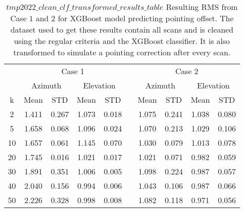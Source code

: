 \begin{table}[!htbp]
    \centering
    \caption{$tmp2022\_clean\_clf\_transformed\_results\_table$
    Resulting RMS from Case $1$ and $2$ for XGBoost model predicting pointing offset.
    The dataset used to get these results contain all scans and is cleaned using the regular criteria and the XGBoost classifier.
    It is also transformed to simulate a pointing correction after every scan.}
    \begin{tabular}{ccccc c cccc}
        \toprule
        \multicolumn{1}{c}{} & \multicolumn{4}{c}{Case 1} & & \multicolumn{4}{c}{Case 2} \\
        \cmidrule(lr){2-5} \cmidrule(lr){7-10}
        \multicolumn{1}{c}{} & \multicolumn{2}{c}{Azimuth} & \multicolumn{2}{c}{Elevation} & & \multicolumn{2}{c}{Azimuth} & \multicolumn{2}{c}{Elevation} \\ 
        \cmidrule(lr){2-5} \cmidrule(lr){7-10}
        k & Mean & STD & Mean & STD & & Mean & STD & Mean & STD \\ 
        \midrule
         2 &     1.411 &     0.267 &     1.073 &     0.018 &  &  1.075 &     0.241 &     1.038 &     0.080 \\
         5 &     1.658 &     0.068 &     1.096 &     0.024 &  &  1.070 &     0.213 &     1.029 &     0.106 \\
        10 &     1.657 &     0.061 &     1.145 &     0.070 &  &  1.030 &     0.079 &     1.013 &     0.078 \\
        20 &     1.745 &     0.016 &     1.021 &     0.017 &  &  1.021 &     0.071 &     0.982 &     0.059 \\
        30 &     1.891 &     0.351 &     1.006 &     0.005 &  &  1.098 &     0.224 &     0.987 &     0.057 \\
        40 &     2.040 &     0.156 &     0.994 &     0.006 &  &  1.043 &     0.106 &     0.987 &     0.066 \\
        50 &     2.226 &     0.328 &     0.998 &     0.008 &  &  1.082 &     0.118 &     0.971 &     0.056 \\
    \bottomrule
\end{tabular}
\end{table}
